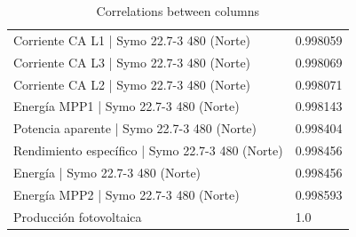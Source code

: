 \documentclass[a4paper,12pt]{article}
\begin{document}
\begin{table}[H]
\begin{tabular}{ll}
Corriente CA L1 | Symo 22.7-3 480 (Norte) & 0.998059 \\
Corriente CA L3 | Symo 22.7-3 480 (Norte) & 0.998069 \\
Corriente CA L2 | Symo 22.7-3 480 (Norte) & 0.998071 \\
Energía MPP1 | Symo 22.7-3 480 (Norte) & 0.998143 \\
Potencia aparente | Symo 22.7-3 480 (Norte) & 0.998404 \\
Rendimiento específico | Symo 22.7-3 480 (Norte) & 0.998456 \\
Energía | Symo 22.7-3 480 (Norte) & 0.998456 \\
Energía MPP2 | Symo 22.7-3 480 (Norte) & 0.998593 \\
Producción fotovoltaica & 1.0 \\
\bottomrule
\end{tabular}
\caption{Correlations between columns}
\label{tab:correlations}
\end{table}
\end{document}
